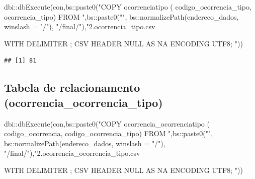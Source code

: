 \documentclass[
]{article}
\newenvironment{Shaded}{\begin{snugshade}}{\end{snugshade}}
\newcommand{\AttributeTok}[1]{\textcolor[rgb]{0.77,0.63,0.00}{#1}}
\newcommand{\FunctionTok}[1]{\textcolor[rgb]{0.00,0.00,0.00}{#1}}
\newcommand{\NormalTok}[1]{#1}
\newcommand{\SpecialCharTok}[1]{\textcolor[rgb]{0.00,0.00,0.00}{#1}}
\newcommand{\StringTok}[1]{\textcolor[rgb]{0.31,0.60,0.02}{#1}}
\begin{document}
\begin{Shaded}
\begin{Highlighting}[]
\NormalTok{dbi}\SpecialCharTok{::}\FunctionTok{dbExecute}\NormalTok{(con,bs}\SpecialCharTok{::}\FunctionTok{paste0}\NormalTok{(}\StringTok{"COPY ocorrenciatipo (}
\StringTok{    codigo\_ocorrencia\_tipo,}
\StringTok{    ocorrencia\_tipo)}
\StringTok{FROM "}\NormalTok{,bs}\SpecialCharTok{::}\FunctionTok{paste0}\NormalTok{(}\StringTok{"\textquotesingle{}"}\NormalTok{,}
\NormalTok{              bs}\SpecialCharTok{::}\FunctionTok{normalizePath}\NormalTok{(endereco\_dados,}
                            \AttributeTok{winslash =} \StringTok{"/"}\NormalTok{),}
              \StringTok{"/final/"}\NormalTok{),}\StringTok{"2.ocorrencia\_tipo.csv\textquotesingle{}}

\StringTok{WITH DELIMITER \textquotesingle{};\textquotesingle{}}
\StringTok{CSV}
\StringTok{HEADER}
\StringTok{NULL AS \textquotesingle{}NA\textquotesingle{}}
\StringTok{ENCODING \textquotesingle{}UTF8\textquotesingle{};}
\StringTok{"}\NormalTok{))}
\end{Highlighting}
\end{Shaded}

\begin{verbatim}
## [1] 81
\end{verbatim}

\hypertarget{tabela-de-relacionamento-ocorrencia_ocorrencia_tipo-1}{%
\subsection{Tabela de relacionamento
(ocorrencia\_ocorrencia\_tipo)}\label{tabela-de-relacionamento-ocorrencia_ocorrencia_tipo-1}}

\begin{Shaded}
\begin{Highlighting}[]
\NormalTok{dbi}\SpecialCharTok{::}\FunctionTok{dbExecute}\NormalTok{(con,bs}\SpecialCharTok{::}\FunctionTok{paste0}\NormalTok{(}\StringTok{"COPY ocorrencia\_ocorrenciatipo (}
\StringTok{    codigo\_ocorrencia,}
\StringTok{    codigo\_ocorrencia\_tipo)}
\StringTok{FROM "}\NormalTok{,bs}\SpecialCharTok{::}\FunctionTok{paste0}\NormalTok{(}\StringTok{"\textquotesingle{}"}\NormalTok{,}
\NormalTok{              bs}\SpecialCharTok{::}\FunctionTok{normalizePath}\NormalTok{(endereco\_dados,}
                            \AttributeTok{winslash =} \StringTok{"/"}\NormalTok{),}
              \StringTok{"/final/"}\NormalTok{),}\StringTok{"2.ocorrencia\_ocorrencia\_tipo.csv\textquotesingle{}}

\StringTok{WITH DELIMITER \textquotesingle{};\textquotesingle{}}
\StringTok{CSV}
\StringTok{HEADER}
\StringTok{NULL AS \textquotesingle{}NA\textquotesingle{}}
\StringTok{ENCODING \textquotesingle{}UTF8\textquotesingle{};}
\StringTok{"}\NormalTok{))}
\end{Highlighting}
\end{Shaded}
\end{document}
